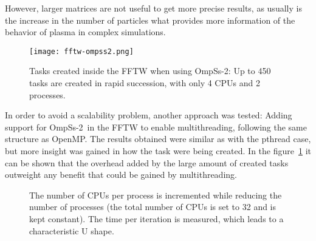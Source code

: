 %
However, larger matrices are not useful to get more precise results, as usually 
is the increase in the number of particles what provides more information of the 
behavior of plasma in complex simulations.

\begin{figure}[h]%
	\centering
	\texttt{[image: fftw-ompss2.png]}
	\caption{Tasks created inside the FFTW when using OmpSs-2: Up to 450 tasks are 
	created in rapid succession, with only 4 CPUs and 2 processes.}
	\label{fig:fftw-ompss2}
\end{figure}%

In order to avoid a scalability problem, another approach was tested: Adding 
support for OmpSs-2~in the FFTW to enable multithreading, following the same 
structure as OpenMP. The results obtained were similar as with the pthread case, 
but more insight was gained in how the task were being created. In the 
figure~\ref{fig:fftw-ompss2} it can be shown that the overhead added by the 
large amount of created tasks outweight any benefit that could be gained by 
multithreading.

\begin{figure}[h]%
	\centering
	\caption{The number of CPUs per process is incremented while reducing the 
	number of processes (the total number of CPUs is set to 32 and is kept 
	constant).  The time per iteration is measured, which leads to a 
	characteristic U shape.}
	\label{fig:fftw-u}
\end{figure}%

